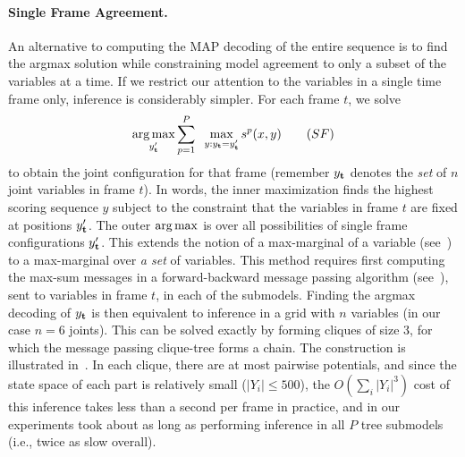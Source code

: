 \paragraph{Single Frame Agreement.} An alternative to computing the
MAP decoding of the entire sequence is to find the argmax solution
while constraining model agreement to only a subset of the variables
at a time.  If we restrict our attention to the variables in a single
time frame only, inference is considerably simpler.  For each frame
$t$, we solve
\begin{equation}
\mathop{\arg\max}_{y_{\bf{t}}'} \sum_{p=1}^P \;\; \max_{y : y_{\bf{t}} = y_{\bf{t}}'} s^p(x,y) \quad{}\quad{(SF)}
\end{equation}
to obtain the joint configuration for that frame (remember $y_{\bf t}$
denotes the {\em set} of $n$ joint variables in frame $t$).  In words,
the inner maximization finds the highest scoring sequence $y$ subject to
the constraint that the variables in frame $t$ are fixed at positions
$y_{\bf t}'$.  The outer $\mathop{\arg\max}$ is over all possibilities of single
frame configurations $y_{\bf t}'$.  This extends the notion of a
max-marginal of a variable (see~) to a max-marginal
over {\em a set} of variables.  This method requires first computing
the max-sum messages in a forward-backward message passing algorithm (see~), sent to variables in frame $t$, in each of the submodels.  Finding the argmax decoding of $y_{\bf t}$ is then
equivalent to inference in a grid with $n$ variables (in our case $n=6$
joints).  This can be solved exactly by forming cliques of size 3, for
which the message passing clique-tree forms a chain. The construction is 
illustrated in~.  In each clique,
there are at most pairwise potentials, and since the state space of
each part is relatively small ($|Y_i| \leq 500$), the $O(\sum_i |Y_i|^3)$ cost 
of this inference takes less than a second per frame in
practice, and in our experiments took about as long as performing inference in 
all $P$ tree submodels (i.e., twice as slow overall).

